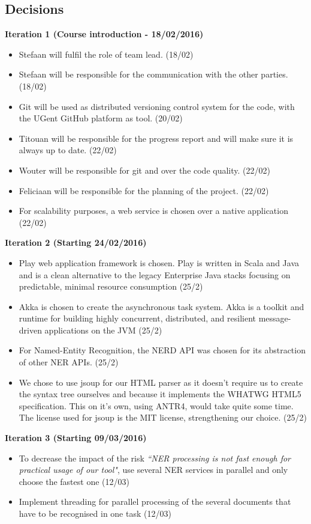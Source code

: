 \documentclass[a4paper,12pt]{article}
\begin{document}
\subsection{Decisions}
\textbf{Iteration 1 (Course introduction - 18/02/2016)}
\begin{itemize}
    \item Stefaan will fulfil the role of team lead. (18/02)
    \item Stefaan will be responsible for the communication with the other parties. (18/02)
    \item Git will be used as distributed versioning control system for the code, with the UGent GitHub platform as tool. (20/02)
    \item Titouan will be responsible for the progress report and will make sure it is always up to date. (22/02)
    \item Wouter will be responsible for git and over the code quality. (22/02)
    \item Feliciaan will be responsible for the planning of the project. (22/02)
   \item For scalability purposes, a web service is chosen over a native application (22/02)
\end{itemize}
\textbf{Iteration 2 (Starting 24/02/2016)}
\begin{itemize}
   \item Play web application framework is chosen. Play is written in Scala and Java and is a clean alternative to the legacy Enterprise Java stacks focusing on predictable, minimal resource consumption (25/2)
    \item Akka is chosen to create the asynchronous task system. Akka is a toolkit and runtime for building highly concurrent, distributed, and resilient message-driven applications on the JVM (25/2)
    \item For Named-Entity Recognition, the NERD API was chosen for its abstraction of other NER APIs. (25/2)
    \item We chose to use jsoup for our HTML parser as it doesn't require us to create the syntax tree ourselves and because it implements the WHATWG HTML5 specification. This on it's own, using ANTR4, would take quite some time. The license used for jsoup is the MIT license, strengthening our choice. (25/2)
\end{itemize}
\textbf{Iteration 3 (Starting 09/03/2016)}
\begin{itemize}
   \item To decrease the impact of the risk \textit{``NER processing is not fast enough for practical usage of our tool"}, use several NER services in parallel and only choose the fastest one (12/03)
   \item Implement threading for parallel processing of the several documents that have to be recognised in one task (12/03)
\end{itemize}
\end{document}
